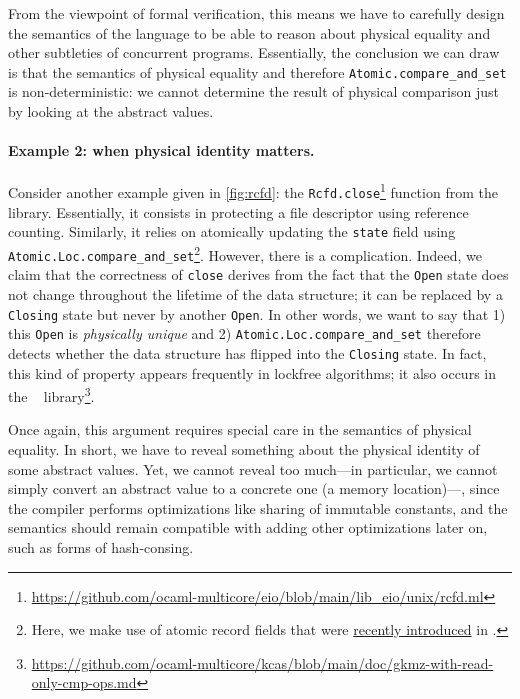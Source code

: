 From the viewpoint of formal verification, this means we have to carefully design the semantics of the language to be able to reason about physical equality and other subtleties of concurrent programs.
Essentially, the conclusion we can draw is that the semantics of physical equality and therefore \texttt{Atomic.compare_and_set} is non-deterministic: we cannot determine the result of physical comparison just by looking at the abstract values.

\paragraph{Example 2: when physical identity matters.}

Consider another example given in \cref{fig:rcfd}: the \texttt{Rcfd.close}\footnote{\url{https://github.com/ocaml-multicore/eio/blob/main/lib_eio/unix/rcfd.ml}} function from the \Eio~\cite{eio} library.
Essentially, it consists in protecting a file descriptor using reference counting.
Similarly, it relies on atomically updating the \texttt{state} field using \texttt{Atomic.Loc.compare_and_set}\footnote{Here, we make use of atomic record fields that were \href{https://github.com/ocaml/ocaml/pull/13404}{recently introduced} in \OCaml.}.
However, there is a complication.
Indeed, we claim that the correctness of \texttt{close} derives from the fact that the \texttt{Open} state does not change throughout the lifetime of the data structure; it can be replaced by a \texttt{Closing} state but never by another \texttt{Open}.
In other words, we want to say that 1) this \texttt{Open} is \emph{physically unique} and 2) \texttt{Atomic.Loc.compare_and_set} therefore detects whether the data structure has flipped into the \texttt{Closing} state.
In fact, this kind of property appears frequently in lockfree algorithms; it also occurs in the \Kcas~\cite{kcas} library\footnote{\url{https://github.com/ocaml-multicore/kcas/blob/main/doc/gkmz-with-read-only-cmp-ops.md}}.

Once again, this argument requires special care in the semantics of physical equality.
In short, we have to reveal something about the physical identity of some abstract values.
Yet, we cannot reveal too much---in particular, we cannot simply convert an abstract value to a concrete one (a memory location)---, since the \OCaml compiler performs optimizations like sharing of immutable constants, and the semantics should remain compatible with adding other optimizations later on, such as forms of hash-consing.

